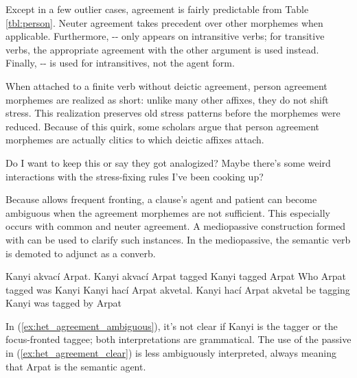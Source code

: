 Except in a few outlier cases, agreement is fairly predictable from Table \ref{tbl:person}. Neuter agreement takes precedent over other morphemes when applicable. Furthermore, -- only appears on intransitive verbs; for transitive verbs, the appropriate agreement with the other argument is used instead. Finally, -- is used for intransitives, not the agent form.

When attached to a finite verb without deictic agreement, person agreement morphemes are realized as short: unlike many other affixes, they do not shift stress. This realization preserves old stress patterns before the morphemes were reduced. Because of this quirk, some scholars argue that person agreement morphemes are actually clitics to which deictic affixes attach.

\begin{kaobox}[frametitle=\sc todo:]
	Do I want to keep this or say they got analogized? Maybe there's some weird interactions with the stress-fixing rules I've been cooking up?
\end{kaobox}

Because \langname{} allows frequent fronting, a clause's agent and patient can become ambiguous when the agreement morphemes are not sufficient. This especially occurs with common and neuter agreement. A mediopassive construction formed with  can be used to clarify such instances. In the mediopassive, the semantic verb is demoted to adjunct as a converb.

\begin{examples*}
	\ex \label{ex:het_agreement_ambiguous}
		\script Kanyi akvací Arpat.
		\bits Kanyi akvací Arpat
		\gloss {} tagged 
		\tr Kanyi tagged Arpat
		\alt Who Arpat tagged was Kanyi
	\ex \label{ex:het_agreement_clear}
		\script Kanyi hací Arpat akvetal.
		\bits Kanyi hací Arpat akvetal
		\gloss {} be  tagging
		\tr Kanyi was tagged by Arpat
\end{examples*}

In (\ref{ex:het_agreement_ambiguous}), it's not clear if Kanyi is the tagger or the focus-fronted taggee; both interpretations are grammatical. The use of the passive in (\ref{ex:het_agreement_clear}) is less ambiguously interpreted, always meaning that Arpat is the semantic agent.

